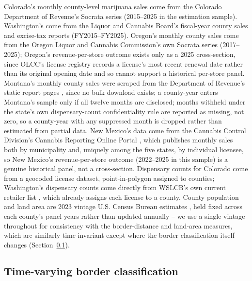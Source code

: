 \documentclass[12pt]{article}
\begin{document}
Colorado's monthly county-level marijuana sales come from the Colorado Department of Revenue's Socrata series
\citep{COMarijuanaSalesByCounty} (2015--2025 in the estimation sample). Washington's come from the Liquor and
Cannabis Board's fiscal-year county sales and excise-tax reports \citep{WALCBSalesByCounty} (FY2015--FY2025).
Oregon's monthly county sales come from the Oregon Liquor and Cannabis Commission's own Socrata series
\citep{OLCCCannabisSalesData} (2017--2025); Oregon's revenue-per-store outcome exists only as a 2025
cross-section, since OLCC's license registry \citep{OLCCLicenseData} records a license's most recent renewal
date rather than its original opening date and so cannot support a historical per-store panel. Montana's
monthly county sales were scraped from the Department of Revenue's static report pages
\citep{MTRevenueCountySales}, since no bulk download exists; a county-year enters Montana's sample only if
all twelve months are disclosed; months withheld under the state's own dispensary-count confidentiality rule
are reported as missing, not zero, so a county-year with any suppressed month is dropped rather than
estimated from partial data. New Mexico's data come from the Cannabis Control Division's Cannabis Reporting
Online Portal \citep{NMCCDReporting}, which publishes monthly sales both by municipality and, uniquely among
the five states, by individual licensee, so New Mexico's revenue-per-store outcome (2022--2025 in this
sample) is a genuine historical panel, not a cross-section. Dispensary counts for Colorado come from a
geocoded license dataset, point-in-polygon assigned to counties; Washington's dispensary counts come directly
from WSLCB's own current retailer list \citep{WALCBCannabisRetailers2026}, which already assigns each license
to a county. County population and land area are 2023 vintage U.S. Census Bureau estimates
\citep{CensusPopEst2023}, held fixed across each county's panel years rather than updated annually -- we use a
single vintage throughout for consistency with the border-distance and land-area measures, which are
similarly time-invariant except where the border classification itself changes (Section~\ref{sec:timevarying}).

\subsection{Time-varying border classification}
\label{sec:timevarying}
\end{document}
